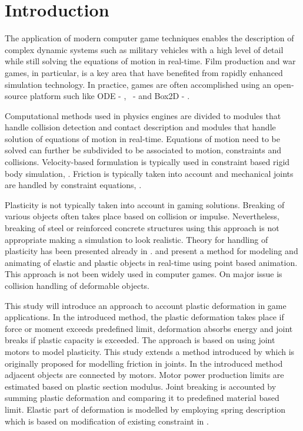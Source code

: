 \section{Introduction}

The application of modern computer game techniques enables the description of complex dynamic systems 
such as military vehicles with a high level of detail while still solving the equations of motion in real-time.
Film production and war games, in particular, is a key area that have benefited from rapidly enhanced simulation technology. 
In practice, games are often accomplished using an open-source platform such 
like ODE - \cite{ode}, \bullet\ - \cite{bullet} and Box2D - \cite{box2d}.

Computational methods used in physics engines are divided to modules that handle collision detection and 
contact description and modules that handle solution of equations of motion in real-time. Equations of motion need to be 
solved can further be subdivided to be associated to motion, constraints and collisions. 
Velocity-based formulation is typically used in constraint based rigid body simulation, \cite{erleben.thesis}. 
Friction is typically taken into account and mechanical joints are handled by constraint equations,
\cite{erleben.thesis}.

Plasticity is not typically taken into account in gaming solutions. 
Breaking of various objects often takes place based on collision or impulse.
Nevertheless, breaking of steel or reinforced concrete structures using this approach 
is not appropriate making a simulation to look realistic. Theory for handling of plasticity 
has been presented already in \cite{cg1988}. \cite{muller2004point} and \cite{muller2005meshless} 
present a method for modeling and animating of elastic and plastic objects in real-time using 
point based animation. This approach is not been widely used in computer games.  
On major issue is collision handling of deformable objects.

This study will introduce an approach to account plastic deformation in game applications.   
In the introduced method, the plastic deformation takes place if force or moment exceeds predefined 
limit, deformation absorbs energy and joint breaks if plastic capacity is exceeded. 
The approach is based on using joint motors to model plasticity. 
This study extends a method introduced by
\citet{erleben.thesis} 
which is originally proposed for modelling friction in joints. 
In the introduced method adjacent objects are connected by motors. 
Motor power production limits are estimated based on plastic section modulus. 
Joint breaking is accounted by summing plastic deformation and comparing it to 
predefined material based limit. Elastic part of deformation is modelled by employing 
spring description which is based on modification of existing constraint in \bullet.

